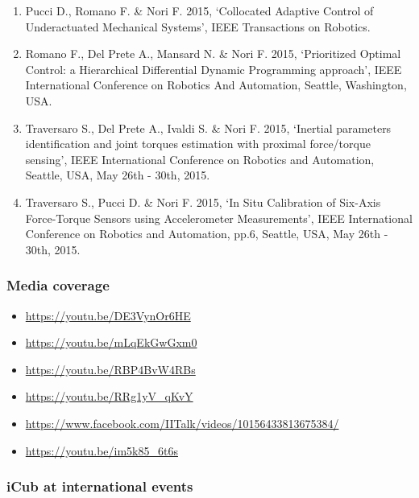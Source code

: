 \begin{enumerate}
\item Pucci D., Romano F. \& Nori F. 2015, ‘Collocated Adaptive Control of Underactuated Mechanical Systems’, IEEE Transactions on Robotics.

\item Romano F., Del Prete A., Mansard N. \& Nori F. 2015, ‘Prioritized Optimal Control: a Hierarchical Differential Dynamic Programming approach’, IEEE International Conference on Robotics And Automation, Seattle, Washington, USA.

\item Traversaro S., Del Prete A., Ivaldi S. \& Nori F. 2015, ‘Inertial parameters identification and joint torques estimation with proximal force/torque sensing’, IEEE International Conference on Robotics and Automation, Seattle, USA, May 26th - 30th, 2015.

\item Traversaro S., Pucci D. \& Nori F. 2015, ‘In Situ Calibration of Six-Axis Force-Torque Sensors using Accelerometer Measurements’, IEEE International Conference on Robotics and Automation, pp.6,  Seattle, USA, May 26th - 30th, 2015.
\end{enumerate}
	
\subsubsection{Media coverage}

\begin{itemize}

\item \url{https://youtu.be/DE3VynOr6HE}

\item \url{https://youtu.be/mLqEkGwGxm0}

\item \url{https://youtu.be/RBP4BvW4RBs}

\item \url{https://youtu.be/RRg1yV_qKvY}

\item \url{https://www.facebook.com/IITalk/videos/10156433813675384/}

\item \url{https://youtu.be/im5k85_6t6s}

\end{itemize}

\subsubsection{iCub at international events}

